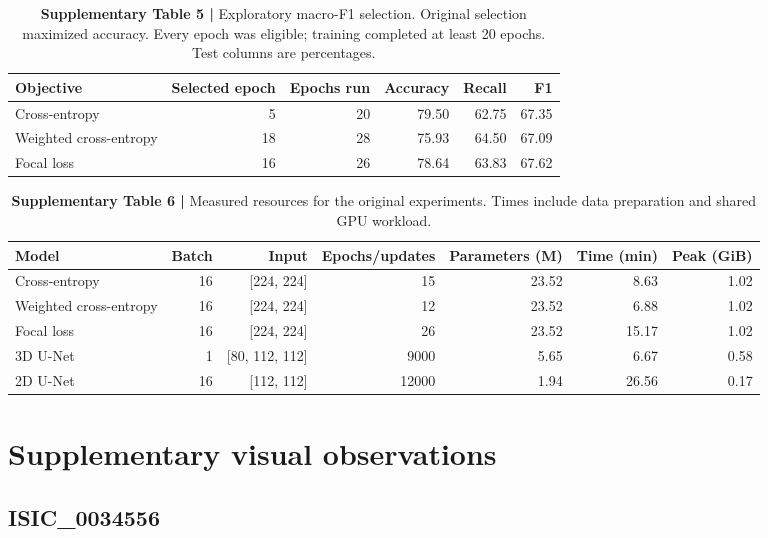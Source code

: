 \documentclass[11pt,a4paper]{article}
\begin{document}
\begin{table}[H]\centering\sffamily\footnotesize
\caption*{\textbf{Supplementary Table 5 | }Exploratory macro-F1 selection. Original selection maximized accuracy. Every epoch was eligible; training completed at least 20 epochs. Test columns are percentages.}
\setlength{\tabcolsep}{5pt}\renewcommand{\arraystretch}{1.18}
\begin{tabular}{lrrrrr}
\toprule
Objective & Selected epoch & Epochs run & Accuracy & Recall & F1 \\
\midrule
Cross-entropy & 5 & 20 & 79.50 & 62.75 & 67.35 \\
Weighted cross-entropy & 18 & 28 & 75.93 & 64.50 & 67.09 \\
Focal loss & 16 & 26 & 78.64 & 63.83 & 67.62 \\
\bottomrule\end{tabular}\end{table}

\begin{table}[H]\centering\sffamily\footnotesize
\caption*{\textbf{Supplementary Table 6 | }Measured resources for the original experiments. Times include data preparation and shared GPU workload.}
\setlength{\tabcolsep}{5pt}\renewcommand{\arraystretch}{1.18}
\begin{tabular}{lrrrrrr}
\toprule
Model & Batch & Input & Epochs/updates & Parameters (M) & Time (min) & Peak (GiB) \\
\midrule
Cross-entropy & 16 & [224, 224] & 15 & 23.52 & 8.63 & 1.02 \\
Weighted cross-entropy & 16 & [224, 224] & 12 & 23.52 & 6.88 & 1.02 \\
Focal loss & 16 & [224, 224] & 26 & 23.52 & 15.17 & 1.02 \\
3D U-Net & 1 & [80, 112, 112] & 9000 & 5.65 & 6.67 & 0.58 \\
2D U-Net & 16 & [112, 112] & 12000 & 1.94 & 26.56 & 0.17 \\
\bottomrule\end{tabular}\end{table}

\section*{Supplementary visual observations}

\subsection*{ISIC\_0034556}
\end{document}
